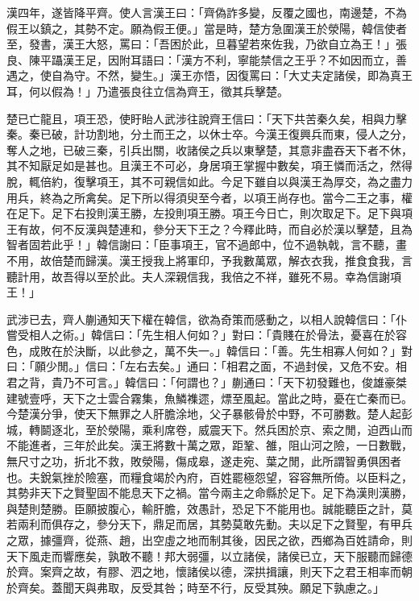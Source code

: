 \begin{pinyinscope}
漢四年，遂皆降平齊。使人言漢王曰：「齊偽詐多變，反覆之國也，南邊楚，不為假王以鎮之，其勢不定。願為假王便。」當是時，楚方急圍漢王於滎陽，韓信使者至，發書，漢王大怒，罵曰：「吾困於此，旦暮望若來佐我，乃欲自立為王！」張良、陳平躡漢王足，因附耳語曰：「漢方不利，寧能禁信之王乎？不如因而立，善遇之，使自為守。不然，變生。」漢王亦悟，因復罵曰：「大丈夫定諸侯，即為真王耳，何以假為！」乃遣張良往立信為齊王，徵其兵擊楚。

楚已亡龍且，項王恐，使盱眙人武涉往說齊王信曰：「天下共苦秦久矣，相與力擊秦。秦已破，計功割地，分土而王之，以休士卒。今漢王復興兵而東，侵人之分，奪人之地，已破三秦，引兵出關，收諸侯之兵以東擊楚，其意非盡吞天下者不休，其不知厭足如是甚也。且漢王不可必，身居項王掌握中數矣，項王憐而活之，然得脫，輒倍約，復擊項王，其不可親信如此。今足下雖自以與漢王為厚交，為之盡力用兵，終為之所禽矣。足下所以得須臾至今者，以項王尚存也。當今二王之事，權在足下。足下右投則漢王勝，左投則項王勝。項王今日亡，則次取足下。足下與項王有故，何不反漢與楚連和，參分天下王之？今釋此時，而自必於漢以擊楚，且為智者固若此乎！」韓信謝曰：「臣事項王，官不過郎中，位不過執戟，言不聽，畫不用，故倍楚而歸漢。漢王授我上將軍印，予我數萬眾，解衣衣我，推食食我，言聽計用，故吾得以至於此。夫人深親信我，我倍之不祥，雖死不易。幸為信謝項王！」

武涉已去，齊人蒯通知天下權在韓信，欲為奇策而感動之，以相人說韓信曰：「仆嘗受相人之術。」韓信曰：「先生相人何如？」對曰：「貴賤在於骨法，憂喜在於容色，成敗在於決斷，以此參之，萬不失一。」韓信曰：「善。先生相寡人何如？」對曰：「願少閒。」信曰：「左右去矣。」通曰：「相君之面，不過封侯，又危不安。相君之背，貴乃不可言。」韓信曰：「何謂也？」蒯通曰：「天下初發難也，俊雄豪桀建號壹呼，天下之士雲合霧集，魚鱗襍遝，熛至風起。當此之時，憂在亡秦而已。今楚漢分爭，使天下無罪之人肝膽涂地，父子暴骸骨於中野，不可勝數。楚人起彭城，轉鬬逐北，至於滎陽，乘利席卷，威震天下。然兵困於京、索之閒，迫西山而不能進者，三年於此矣。漢王將數十萬之眾，距鞏、雒，阻山河之險，一日數戰，無尺寸之功，折北不救，敗滎陽，傷成皋，遂走宛、葉之閒，此所謂智勇俱困者也。夫銳氣挫於險塞，而糧食竭於內府，百姓罷極怨望，容容無所倚。以臣料之，其勢非天下之賢聖固不能息天下之禍。當今兩主之命縣於足下。足下為漢則漢勝，與楚則楚勝。臣願披腹心，輸肝膽，效愚計，恐足下不能用也。誠能聽臣之計，莫若兩利而俱存之，參分天下，鼎足而居，其勢莫敢先動。夫以足下之賢聖，有甲兵之眾，據彊齊，從燕、趙，出空虛之地而制其後，因民之欲，西鄉為百姓請命，則天下風走而響應矣，孰敢不聽！邦大弱彊，以立諸侯，諸侯已立，天下服聽而歸德於齊。案齊之故，有膠、泗之地，懷諸侯以德，深拱揖讓，則天下之君王相率而朝於齊矣。蓋聞天與弗取，反受其咎；時至不行，反受其殃。願足下孰慮之。」


\end{pinyinscope}

